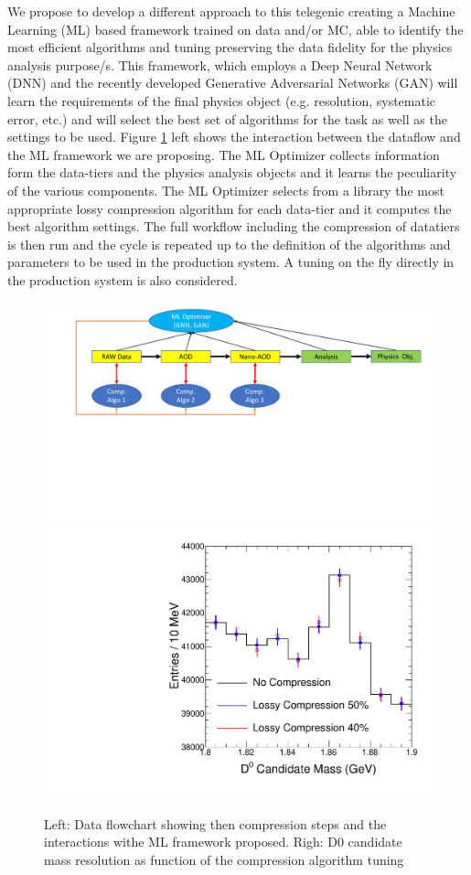 We propose to develop a different approach to this telegenic creating a Machine Learning (ML) based framework trained on data and/or MC, able to identify the most efficient algorithms and tuning preserving the data fidelity for the physics analysis purpose/s.
This framework, which employs a Deep Neural Network (DNN) and the recently developed Generative Adversarial Networks (GAN) will learn the requirements of the final physics object (e.g. resolution, systematic error, etc.) and will select the best set of algorithms for the task as well as the settings to be used. Figure \ref{fig:concept} left shows the interaction between the dataflow and the ML framework we are proposing. The ML Optimizer collects information form the data-tiers and the physics analysis objects and it learns the peculiarity of the various components. The ML Optimizer selects from a library the most appropriate lossy compression algorithm for each data-tier and it computes the best algorithm settings. The full workflow including the compression of datatiers is then run and the cycle is repeated up to the definition of the algorithms and parameters to be used in the production system. A tuning on the fly directly in the production system is also considered.   

\begin{figure}[!ht]
    \vspace{-0.4cm}
    \begin{center}
    \includegraphics[width=.71\textwidth]{HI_Compress/figure/CompSchema.pdf}
    \hspace{0.0\textwidth}
    \includegraphics[width=.27\textwidth]{HI_Compress/figure/aleph/Performance.pdf}
    \vspace{-0.5cm}
    \caption{Left: Data flowchart showing then compression steps and the interactions withe ML framework proposed. Righ: D0 candidate mass resolution as function of the compression algorithm tuning}
    \label{fig:concept}
    \end{center}
\end{figure}

